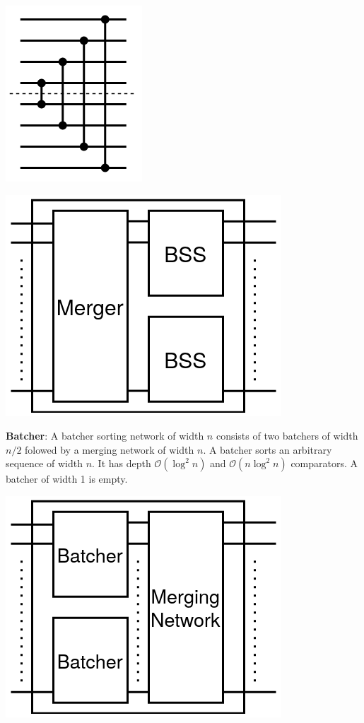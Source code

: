\documentclass[a4paper, 8pt, landscape]{scrartcl}
\begin{document}
\begin{multicols*}{3}
\vspace*{-1mm}
\begin{minipage}{0.5\columnwidth}
	\centering
	\includegraphics[width=0.47\columnwidth]{source/merger}
\end{minipage}%
\begin{minipage}{0.5\columnwidth}
	\centering
	\includegraphics[width=0.75\columnwidth]{source/mn}
\end{minipage}
\vspace*{-1mm}

\textbf{Batcher}: A batcher sorting network of width $n$ consists of two batchers of width $n/2$ folowed by a merging network of width $n$. A batcher sorts an arbitrary sequence of width $n$. It has depth $\mathcal{O}(\log^2 n)$ and $\mathcal{O}(n \log^2 n)$ comparators. A batcher of width 1 is empty.

\vspace*{-1mm}
\begin{minipage}{\columnwidth}
	\centering
	\includegraphics[width=0.4\columnwidth]{source/batcher}
\end{minipage}


\end{multicols*}
\end{document}
